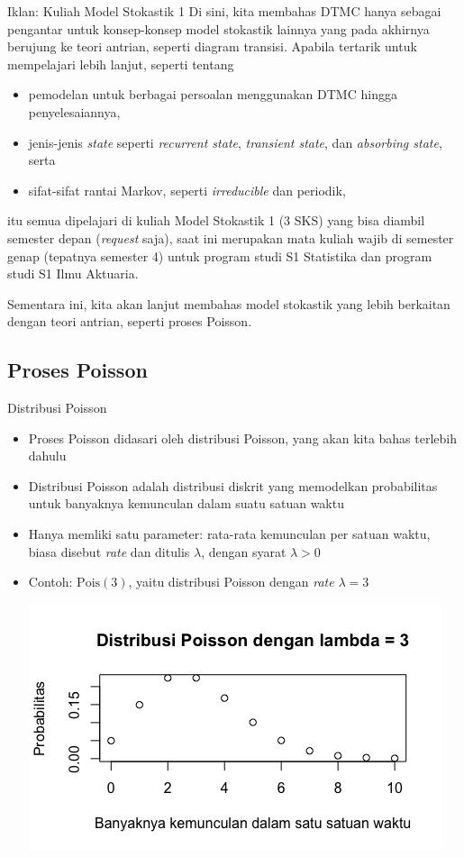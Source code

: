 \documentclass{beamer}
\begin{document}
\begin{frame}{Iklan: Kuliah Model Stokastik 1}
Di sini, kita membahas DTMC hanya sebagai pengantar untuk konsep-konsep model stokastik lainnya yang pada akhirnya berujung ke teori antrian, seperti diagram transisi. Apabila tertarik untuk mempelajari lebih lanjut, seperti tentang
\begin{itemize}
    \item pemodelan untuk berbagai persoalan menggunakan DTMC hingga penyelesaiannya,
    \item jenis-jenis \textit{state} seperti \textit{recurrent state}, \textit{transient state}, dan \textit{absorbing state}, serta
    \item sifat-sifat rantai Markov, seperti \textit{irreducible} dan periodik,
\end{itemize}
itu semua dipelajari di kuliah Model Stokastik 1 (3 SKS) yang bisa diambil semester depan (\textit{request} saja), saat ini merupakan mata kuliah wajib di semester genap (tepatnya semester 4) untuk program studi S1 Statistika dan program studi S1 Ilmu Aktuaria.

Sementara ini, kita akan lanjut membahas model stokastik yang lebih berkaitan dengan teori antrian, seperti proses Poisson.
\end{frame}

\subsection{Proses Poisson}

\begin{frame}{Distribusi Poisson}
    \begin{itemize}
        \item Proses Poisson didasari oleh distribusi Poisson, yang akan kita bahas terlebih dahulu
        \item Distribusi Poisson adalah distribusi diskrit yang memodelkan probabilitas untuk banyaknya kemunculan dalam suatu satuan waktu
        \item Hanya memliki satu parameter: rata-rata kemunculan per satuan waktu, biasa disebut \textit{rate} dan ditulis \( \lambda \), dengan syarat \( \lambda > 0 \)
        \item Contoh: \( \text{Pois}(3) \), yaitu distribusi Poisson dengan \textit{rate} \( \lambda = 3 \)

        \includegraphics[scale=0.45]{gambar/dist_pois_lambda3.png}
    \end{itemize}
\end{frame}
\end{document}
